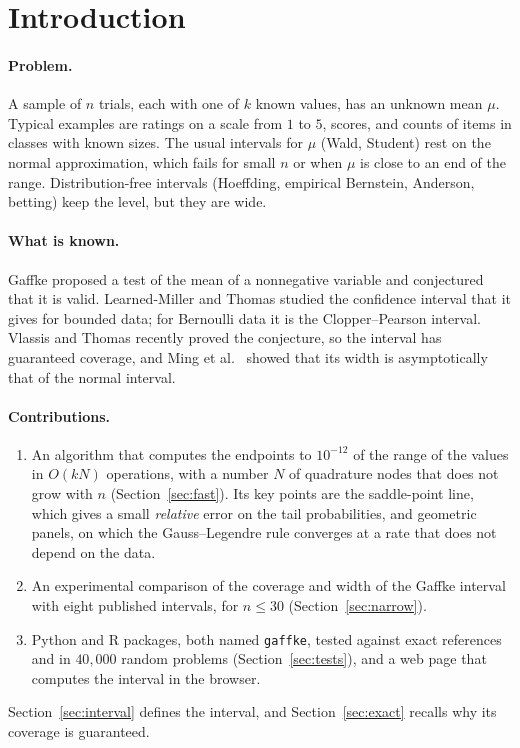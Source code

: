 \documentclass[11pt]{article}
\begin{document}
\section{Introduction}

\paragraph{Problem.}
A sample of $n$ trials, each with one of $k$ known values, has an unknown mean $\mu$.
Typical examples are ratings on a scale from $1$ to $5$, scores, and counts of items in classes with known sizes.
The usual intervals for $\mu$ (Wald, Student) rest on the normal approximation, which fails for small $n$ or when $\mu$ is close to an end of the range.
Distribution-free intervals (Hoeffding, empirical Bernstein, Anderson, betting) keep the level, but they are wide.

\paragraph{What is known.}
Gaffke \cite{gaffke2005} proposed a test of the mean of a nonnegative variable and conjectured that it is valid.
Learned-Miller and Thomas \cite{lmt2019} studied the confidence interval that it gives for bounded data; for Bernoulli data it is the Clopper--Pearson interval.
Vlassis and Thomas \cite{vlassis2026} recently proved the conjecture, so the interval has guaranteed coverage, and Ming et al.\ \cite{ming2026} showed that its width is asymptotically that of the normal interval.

\paragraph{Contributions.}
\begin{enumerate}[nosep]
  \item An algorithm that computes the endpoints to $10^{-12}$ of the range of the values in $O(kN)$ operations, with a number $N$ of quadrature nodes that does not grow with $n$ (Section~\ref{sec:fast}). Its key points are the saddle-point line, which gives a small \emph{relative} error on the tail probabilities, and geometric panels, on which the Gauss--Legendre rule converges at a rate that does not depend on the data.
  \item An experimental comparison of the coverage and width of the Gaffke interval with eight published intervals, for $n \le 30$ (Section~\ref{sec:narrow}).
  \item Python and R packages, both named \texttt{gaffke}, tested against exact references and in $40{,}000$ random problems (Section~\ref{sec:tests}), and a web page that computes the interval in the browser.
\end{enumerate}
Section~\ref{sec:interval} defines the interval, and Section~\ref{sec:exact} recalls why its coverage is guaranteed.
\end{document}
